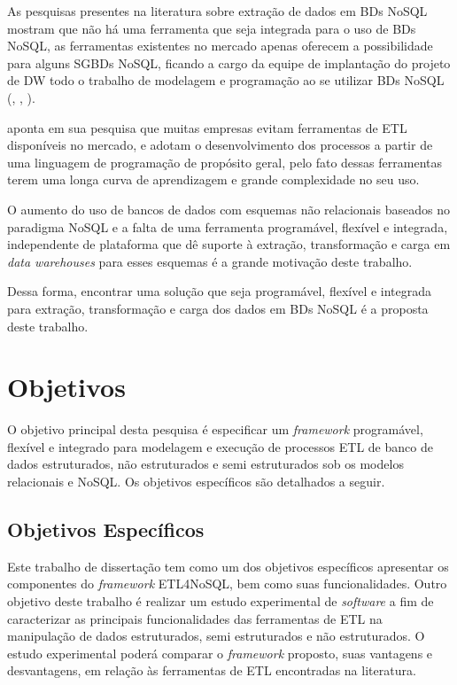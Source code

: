 As pesquisas presentes na literatura sobre extração de dados em BDs NoSQL mostram que não há uma ferramenta que seja integrada para o uso de BDs NoSQL, as ferramentas existentes no mercado apenas oferecem a possibilidade para alguns \acp{SGBD} NoSQL, ficando a cargo da equipe de implantação do projeto de DW todo o trabalho de modelagem e programação ao se utilizar BDs NoSQL (\cite{silva:2016}, \cite{chevalier:2015}, \cite{liu:2013}).

\cite{silva:2012} aponta em sua pesquisa que muitas empresas evitam ferramentas de ETL disponíveis no mercado, e adotam o desenvolvimento dos processos a partir de uma linguagem de programação de propósito geral, pelo fato dessas ferramentas terem uma longa curva de aprendizagem e grande complexidade no seu uso.

O aumento do uso de bancos de dados com esquemas não relacionais baseados no paradigma NoSQL e a falta de uma ferramenta programável, flexível e integrada, independente de plataforma que dê suporte à extração, transformação e carga em \textit{data warehouses} para esses esquemas é a grande motivação deste trabalho.

Dessa forma, encontrar uma solução que seja programável, flexível e integrada para extração, transformação e carga dos dados em BDs NoSQL é a proposta deste trabalho.





\section{Objetivos}

O objetivo principal desta pesquisa é especificar um \textit{framework} programável, flexível e integrado para modelagem e execução de processos ETL de banco de dados estruturados, não estruturados e semi estruturados sob os modelos relacionais e NoSQL. Os objetivos específicos são detalhados a seguir.

\subsection{Objetivos Específicos}

Este trabalho de dissertação tem como um dos objetivos específicos apresentar os componentes do \textit{framework} ETL4NoSQL, bem como suas funcionalidades. Outro objetivo deste trabalho é realizar um estudo experimental de \textit{software} a fim de caracterizar as principais funcionalidades das ferramentas de ETL na manipulação de dados estruturados, semi estruturados e não estruturados. O estudo experimental poderá comparar o \textit{framework} proposto, suas vantagens e desvantagens, em relação às ferramentas de ETL encontradas na literatura.

